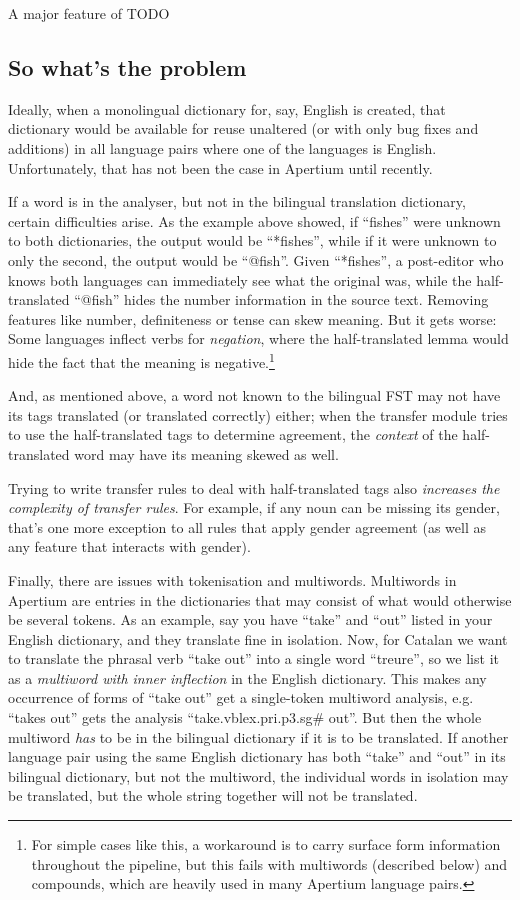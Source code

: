 \documentclass[11pt]{article}
\begin{document}
A major feature of  TODO

\subsection{So what's the problem}

Ideally, when a monolingual dictionary for, say, English is created,
that dictionary would be available for reuse unaltered (or with only
bug fixes and additions) in all language pairs where one of the
languages is English. Unfortunately, that has not been the case in
Apertium until recently.

If a word is in the analyser, but not in the bilingual translation
dictionary, certain difficulties arise. As the example above showed,
if ``fishes'' were unknown to both dictionaries, the output would be
``*fishes'', while if it were unknown to only the second, the output
would be ``@fish''. Given ``*fishes'', a post-editor who knows both
languages can immediately see what the original was, while the
half-translated ``@fish'' hides the number information in the source
text. Removing features like number, definiteness or tense can skew
meaning.  But it gets worse: Some languages inflect verbs for
\emph{negation}, where the half-translated lemma would hide the fact
that the meaning is negative.\footnote{For simple cases like this, a
    workaround is to carry surface form information throughout the
    pipeline, but this fails with multiwords (described below) and
    compounds, which are heavily used in many Apertium language
    pairs.}

And, as mentioned above, a word not known to the bilingual FST may not
have its tags translated (or translated correctly) either; when the
transfer module tries to use the half-translated tags to determine
agreement, the \emph{context} of the half-translated word may have its
meaning skewed as well.

Trying to write transfer rules to deal with half-translated tags also
\emph{increases the complexity of transfer rules}. For example, if any
noun can be missing its gender, that's one more exception to all rules
that apply gender agreement (as well as any feature that interacts with
gender).

Finally, there are issues with tokenisation and multiwords.
Multiwords in Apertium are entries in the dictionaries that may
consist of what would otherwise be several tokens. As an example, say
you have ``take'' and ``out'' listed in your English dictionary, and
they translate fine in isolation. Now, for Catalan we want to
translate the phrasal verb ``take out'' into a single word ``treure'',
so we list it as a \emph{multiword with inner inflection} in the
English dictionary. This makes any occurrence of forms of ``take out''
get a single-token multiword analysis, e.g. ``takes out'' gets the
analysis ``take.vblex.pri.p3.sg\# out''. But then the whole multiword
\emph{has} to be in the bilingual dictionary if it is to be
translated. If another language pair using the same English dictionary
has both ``take'' and ``out'' in its bilingual dictionary, but not the
multiword, the individual words in isolation may be translated, but
the whole string together will not be translated.
\end{document}
